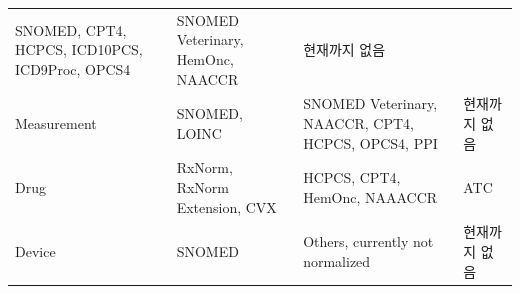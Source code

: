 \documentclass[10.5pt]{book}
\theoremstyle{definition}
\theoremstyle{definition}
\theoremstyle{definition}
\theoremstyle{remark}
\begin{document}
\begin{longtable}[]{@{}llll@{}}
\begin{minipage}[t]{0.21\columnwidth}
SNOMED, CPT4, HCPCS, ICD10PCS, ICD9Proc, OPCS4\strut
\end{minipage} & \begin{minipage}[t]{0.21\columnwidth}\raggedright\strut
SNOMED Veterinary, HemOnc, NAACCR\strut
\end{minipage} & \begin{minipage}[t]{0.18\columnwidth}\raggedright\strut
현재까지 없음\strut
\end{minipage}\tabularnewline
\begin{minipage}[t]{0.12\columnwidth}\raggedright\strut
Measurement\strut
\end{minipage} & \begin{minipage}[t]{0.21\columnwidth}\raggedright\strut
SNOMED, LOINC\strut
\end{minipage} & \begin{minipage}[t]{0.21\columnwidth}\raggedright\strut
SNOMED Veterinary, NAACCR, CPT4, HCPCS, OPCS4, PPI\strut
\end{minipage} & \begin{minipage}[t]{0.18\columnwidth}\raggedright\strut
현재까지 없음\strut
\end{minipage}\tabularnewline
\begin{minipage}[t]{0.12\columnwidth}\raggedright\strut
Drug\strut
\end{minipage} & \begin{minipage}[t]{0.21\columnwidth}\raggedright\strut
RxNorm, RxNorm Extension, CVX\strut
\end{minipage} & \begin{minipage}[t]{0.21\columnwidth}\raggedright\strut
HCPCS, CPT4, HemOnc, NAAACCR\strut
\end{minipage} & \begin{minipage}[t]{0.18\columnwidth}\raggedright\strut
ATC\strut
\end{minipage}\tabularnewline
\begin{minipage}[t]{0.12\columnwidth}\raggedright\strut
Device\strut
\end{minipage} & \begin{minipage}[t]{0.21\columnwidth}\raggedright\strut
SNOMED\strut
\end{minipage} & \begin{minipage}[t]{0.21\columnwidth}\raggedright\strut
Others, currently not normalized\strut
\end{minipage} & \begin{minipage}[t]{0.18\columnwidth}\raggedright\strut
현재까지 없음\strut
\end{minipage}\tabularnewline

\end{longtable}
\end{document}

